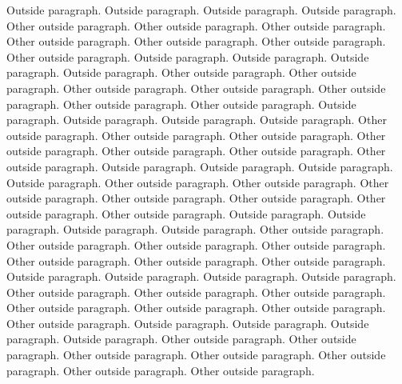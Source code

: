\documentclass{article}
\begin{document}
\begin{pairs}
\begin{Rightside}
            \pend
                        \pstart
                Outside paragraph. Outside paragraph. Outside paragraph. Outside paragraph.
            \pend
            \pstart
                Other outside paragraph. Other outside paragraph. Other outside paragraph. Other outside paragraph. Other outside paragraph. Other outside paragraph. Other outside paragraph.
            \pend
                        \pstart
                Outside paragraph. Outside paragraph. Outside paragraph. Outside paragraph.
            \pend
            \pstart
                Other outside paragraph. Other outside paragraph. Other outside paragraph. Other outside paragraph. Other outside paragraph. Other outside paragraph. Other outside paragraph.
            \pend
                        \pstart
                Outside paragraph. Outside paragraph. Outside paragraph. Outside paragraph.
            \pend
            \pstart
                Other outside paragraph. Other outside paragraph. Other outside paragraph. Other outside paragraph. Other outside paragraph. Other outside paragraph. Other outside paragraph.
            \pend
                        \pstart
                Outside paragraph. Outside paragraph. Outside paragraph. Outside paragraph.
            \pend
            \pstart
                Other outside paragraph. Other outside paragraph. Other outside paragraph. Other outside paragraph. Other outside paragraph. Other outside paragraph. Other outside paragraph.
            \pend
                        \pstart
                Outside paragraph. Outside paragraph. Outside paragraph. Outside paragraph.
            \pend
            \pstart
                Other outside paragraph. Other outside paragraph. Other outside paragraph. Other outside paragraph. Other outside paragraph. Other outside paragraph. Other outside paragraph.
            \pend
                        \pstart
                Outside paragraph. Outside paragraph. Outside paragraph. Outside paragraph.
            \pend
            \pstart
                Other outside paragraph. Other outside paragraph. Other outside paragraph. Other outside paragraph. Other outside paragraph. Other outside paragraph. Other outside paragraph.
            \pend
                        \pstart
                Outside paragraph. Outside paragraph. Outside paragraph. Outside paragraph.
            \pend
            \pstart
                Other outside paragraph. Other outside paragraph. Other outside paragraph. Other outside paragraph. Other outside paragraph. Other outside paragraph. Other outside paragraph.
            \pend

\end{Rightside}
\end{pairs}
\end{document}
